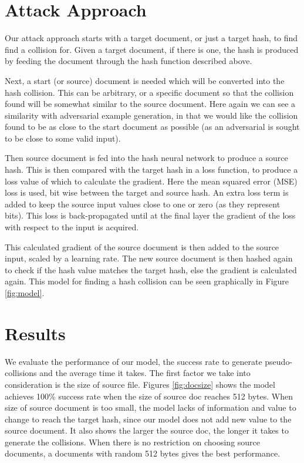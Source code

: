 \documentclass{article}
\begin{document}
\section{Attack Approach}

Our attack approach starts with a target document, or just a target hash, to
find find a collision for. Given a target document, if there is one, the hash
is produced by feeding the document through the hash function described above.

Next, a start (or source) document is needed which will be converted into the
hash collision.  This can be arbitrary, or a specific document so that the
collision found will be somewhat similar to the source document. Here again we
can see a similarity with adversarial example generation, in that we would like
the collision found to be as close to the start document as possible (as an
adversarial is sought to be close to some valid input).

Then source document is fed into the hash neural network to produce a source hash.
This is then compared with the target hash in a loss function, to produce a loss
value of which to calculate the gradient. Here the mean squared error (MSE) loss
is used, bit wise between the target and source hash. An extra loss term is
added to keep the source input values close to one or zero (as they represent bits).
This loss is back-propagated until at the final layer the gradient of the loss
with respect to the input is acquired.

This calculated gradient of the source document is then added to the source
input, scaled by a learning rate. The new source document is then hashed again
to check if the hash value matches the target hash, else the gradient is
calculated again.  This model for finding a hash collision can be seen
graphically in Figure \ref{fig:model}.

\section{Results}
We evaluate the performance of our model, the success rate to generate pseudo-collisions and  the average time it takes. The first factor we take into consideration is the size of source file. Figures \ref{fig:docsize} shows the model achieves 100\% success rate when the size of source doc reaches 512 bytes. When size of source document is too small, the model lacks of information and value to change to reach the target hash, since our model does not add new value to the source document. It also shows the larger the source doc, the longer it takes to generate the collisions. When there is no restriction on choosing source documents, a documents with random 512 bytes gives the best performance.
\end{document}
